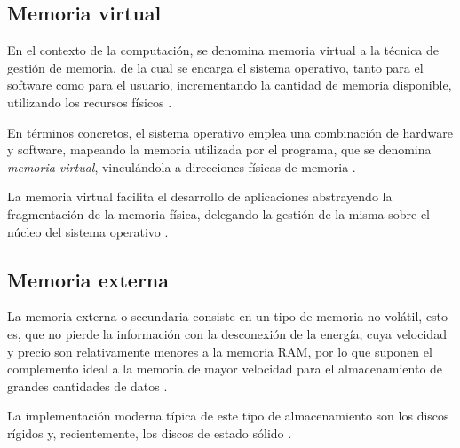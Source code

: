 \documentclass[12pt]{article}
\begin{document}
\subsection{Memoria virtual}

En el contexto de la computación, 
se denomina memoria virtual a la técnica de gestión de memoria,
de la cual se encarga el sistema operativo,
tanto para el software como para el usuario,
incrementando la cantidad de memoria disponible,
utilizando los recursos físicos \parencite{wiki_es_memoria_virtual}.

En términos concretos, 
el sistema operativo emplea una combinación de hardware y software,
mapeando la memoria utilizada por el programa,
que se denomina \textit{memoria virtual},
vinculándola a direcciones físicas de memoria \parencite{wiki_en_virtual_memory}.

La memoria virtual facilita el desarrollo de aplicaciones abstrayendo la 
fragmentación de la memoria física, delegando la gestión de la misma sobre 
el núcleo del sistema operativo \parencite{wiki_en_virtual_memory}.

\subsection{Memoria externa}

La memoria externa o secundaria consiste en un tipo de memoria no volátil,
esto es,
que no pierde la información con la desconexión de la energía,
cuya velocidad y precio son relativamente menores a la memoria RAM,
por lo que suponen el complemento ideal a la memoria de mayor velocidad 
para el almacenamiento de grandes cantidades de datos \parencite{wiki_en_secondary_storage}.

La implementación moderna típica de este tipo de almacenamiento son los 
discos rígidos y, recientemente, los discos de estado sólido \parencite{wiki_en_secondary_storage}.

\printbibliography[heading=bibnumbered]
\end{document}
